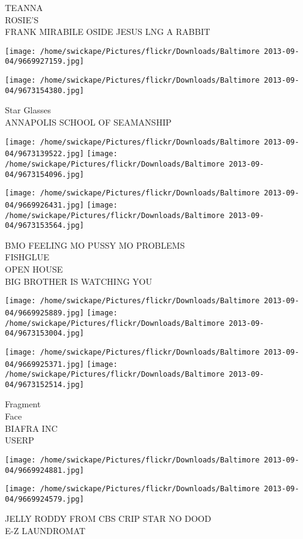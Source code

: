 \documentclass[10pt,letterpaper]{article}
\begin{document}
TEANNA\\
ROSIE'S\\
FRANK MIRABILE OSIDE JESUS LNG A RABBIT
\pagebreak

\texttt{[image: /home/swickape/Pictures/flickr/Downloads/Baltimore 2013-09-04/9669927159.jpg]}

\vspace{0.25in}
\texttt{[image: /home/swickape/Pictures/flickr/Downloads/Baltimore 2013-09-04/9673154380.jpg]}

Star Glasses\\
ANNAPOLIS SCHOOL OF SEAMANSHIP
\pagebreak

\texttt{[image: /home/swickape/Pictures/flickr/Downloads/Baltimore 2013-09-04/9673139522.jpg]}
\texttt{[image: /home/swickape/Pictures/flickr/Downloads/Baltimore 2013-09-04/9673154096.jpg]}

\texttt{[image: /home/swickape/Pictures/flickr/Downloads/Baltimore 2013-09-04/9669926431.jpg]}
\texttt{[image: /home/swickape/Pictures/flickr/Downloads/Baltimore 2013-09-04/9673153564.jpg]}

BMO FEELING MO PUSSY MO PROBLEMS\\
FISHGLUE\\
OPEN HOUSE\\
BIG BROTHER IS WATCHING YOU
\pagebreak

\texttt{[image: /home/swickape/Pictures/flickr/Downloads/Baltimore 2013-09-04/9669925889.jpg]}
\texttt{[image: /home/swickape/Pictures/flickr/Downloads/Baltimore 2013-09-04/9673153004.jpg]}

\texttt{[image: /home/swickape/Pictures/flickr/Downloads/Baltimore 2013-09-04/9669925371.jpg]}
\texttt{[image: /home/swickape/Pictures/flickr/Downloads/Baltimore 2013-09-04/9673152514.jpg]}

Fragment\\
Face\\
BIAFRA INC\\
USERP
\pagebreak

\texttt{[image: /home/swickape/Pictures/flickr/Downloads/Baltimore 2013-09-04/9669924881.jpg]}

\vspace{0.25in}
\texttt{[image: /home/swickape/Pictures/flickr/Downloads/Baltimore 2013-09-04/9669924579.jpg]}

JELLY RODDY FROM CBS CRIP STAR NO DOOD\\
E{-}Z LAUNDROMAT
\pagebreak
\end{document}
